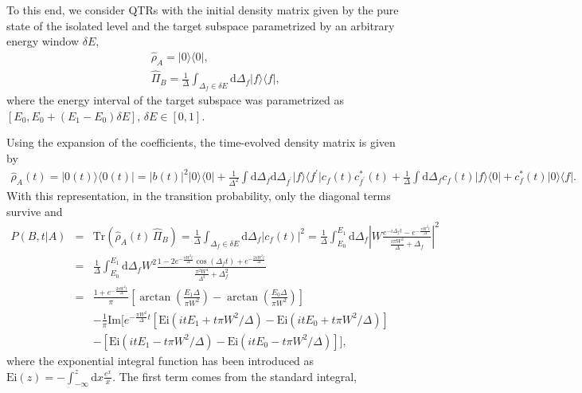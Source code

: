 \documentclass[prl,aps,amssymb,twocolumn,superscriptaddress, notitlepage, longbibliography]{revtex4-2}
\begin{document}
To this end, we consider QTRs with the initial density matrix given by the pure state of the isolated level and the target subspace parametrized by an arbitrary energy window $\delta E$,
\begin{eqnarray}
    &&\hat\rho_A=\lvert 0\rangle\langle 0\rvert,\\
    &&\hat\Pi_B=\frac{1}{\Delta}\int_{\Delta_f\in \delta E}\mathrm d\Delta_f\lvert f\rangle\langle f\rvert,
\end{eqnarray}
where the energy interval of the target subspace was parametrized as $[E_0,E_0+(E_1-E_0)\delta E],\,\delta E\in[0,1]$.

Using the expansion of the coefficients, the time-evolved density matrix is given by
\begin{eqnarray}
    \hat\rho_A(t)=\lvert 0(t)\rangle\langle 0(t)\rvert=\lvert b(t)\rvert^2\lvert 0\rangle\langle 0\rvert +\frac{1}{\Delta^2}\int\mathrm d\Delta_f\mathrm d\Delta_{f^\prime}\lvert f\rangle\langle f^\prime\rvert c_f(t)c^*_{f^\prime}(t)+\frac{1}{\Delta}\int\mathrm d\Delta_f c_f(t)\lvert f\rangle\langle 0\rvert +c^*_f(t)\lvert 0\rangle\langle f\rvert.
\end{eqnarray}
With this representation, in the transition probability, only the diagonal terms survive and
\begin{eqnarray}\label{eq: PAB}
    P(B,t\vert A)&=&\mathrm{Tr}(\hat\rho_A(t)\,\hat\Pi_B)=\frac{1}{\Delta}\int_{\Delta_f\in\delta E}\mathrm d\Delta_f\lvert c_f(t)\rvert^2=\frac{1}{\Delta}\int_{E_0}^{E_1}\mathrm d\Delta_f\left\lvert W\frac{e^{-i\Delta_ft}-e^{-\frac{\pi W^2t}{\Delta}}}{\frac{i\pi W^2}{\Delta}+\Delta_f}\right\rvert^2\\
    &=&\frac{1}{\Delta}\int_{E_0}^{E_1}\mathrm d\Delta_fW^2\frac{1-2e^{-\frac{\pi W^2t}{\Delta}}\cos(\Delta_ft)+e^{-\frac{2\pi W^2t}{\Delta}}}{\frac{\pi^2 W^4}{\Delta^2}+\Delta^2_f}\nonumber\\
    &=&\frac{1+e^{-\frac{2\pi W^2t}{\Delta}}}{\pi}\left[\arctan\left(\frac{E_1\Delta}{\pi W^2}\right)-\arctan\left(\frac{E_0\Delta}{\pi W^2}\right)\right]\nonumber\\
    &&-\frac{1}{\pi}\mathrm{Im}\Big[e^{-\frac{\pi W^2}{\Delta}t}\left[\mathrm{Ei}(itE_1+t\pi W^2/\Delta )-\mathrm{Ei}(itE_0+t\pi W^2/\Delta)\right]\nonumber\\
    &&-\left[\mathrm{Ei}(itE_1-t\pi W^2/\Delta)-\mathrm{Ei}(itE_0-t\pi W^2/\Delta)\right]\Big],\nonumber
\end{eqnarray}
where the exponential integral function has been introduced as $\mathrm{Ei}(z)=-\int_{-\infty}^z\mathrm dx\frac{e^{x}}{x}$. The first term comes from the standard integral,
\end{document}
